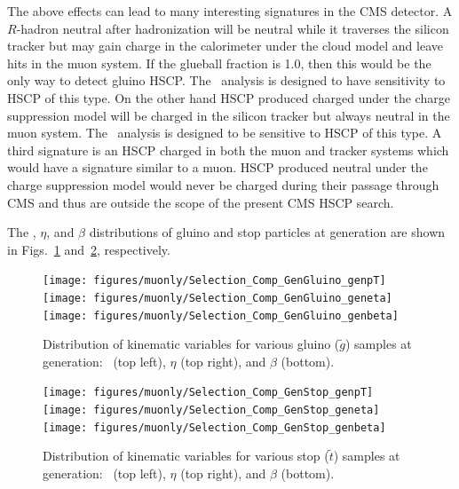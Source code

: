 The above effects can lead to many interesting signatures in the CMS detector. A $R$-hadron neutral after hadronization will be neutral while it traverses the silicon tracker
but may gain charge in the calorimeter under the cloud model and leave hits in the muon system. If the glueball fraction is 1.0, then this would
be the only way to detect gluino HSCP. The \muononly\ analysis is designed to have sensitivity to HSCP of this type. On the other hand HSCP produced charged under
the charge suppression model will be charged in the silicon tracker but always neutral in the muon system. The \tkonly\ analysis is designed to be sensitive
to HSCP of this type. A third signature is an HSCP charged in both the muon and tracker systems which would have a signature similar to a muon.
HSCP produced neutral under the charge suppression model would never be charged during their passage through CMS and thus are outside the scope
of the present CMS HSCP search.

The \pt, $\eta$, and $\beta$ distributions of gluino and stop particles at generation are shown in Figs.~\ref{fig:GenGluino} and~\ref{fig:GenStop}, respectively.

\begin{figure}
 \begin{center}
  \texttt{[image: figures/muonly/Selection\_Comp\_GenGluino\_genpT]}
  \texttt{[image: figures/muonly/Selection\_Comp\_GenGluino\_geneta]}
  \texttt{[image: figures/muonly/Selection\_Comp\_GenGluino\_genbeta]}
 \end{center}
 \caption[Distribution of \pt, $\eta$, and $\beta$ for various gluino samples at generation]
{Distribution of kinematic variables for various gluino ($\tilde{g}$) samples at generation:
\pt\ (top left), $\eta$ (top right), and $\beta$ (bottom).
   \label{fig:GenGluino}}
\end{figure}

\begin{figure}
 \begin{center}
  \texttt{[image: figures/muonly/Selection\_Comp\_GenStop\_genpT]}
  \texttt{[image: figures/muonly/Selection\_Comp\_GenStop\_geneta]}
  \texttt{[image: figures/muonly/Selection\_Comp\_GenStop\_genbeta]}
 \end{center}
 \caption[Distribution of \pt, $\eta$, and $\beta$ for various stop samples at generation]
{Distribution of kinematic variables for various stop ($\tilde{t}$) samples at generation:
\pt\ (top left), $\eta$ (top right), and $\beta$ (bottom).
   \label{fig:GenStop}}
\end{figure}

